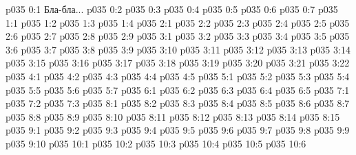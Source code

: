 \author{Глава архангелов}
\vs p035 0:1  Бла-бла...
\vs p035 0:2 
\vs p035 0:3 
\vs p035 0:4 
\vs p035 0:5 
\vs p035 0:6 
\vs p035 0:7 \pc 
{}
\vs p035 1:1 
\vs p035 1:2 
\vs p035 1:3 
\vs p035 1:4 
\vs p035 2:1 
\vs p035 2:2 
\vs p035 2:3 \pc 
\vs p035 2:4 
\vs p035 2:5 
\vs p035 2:6 
\vs p035 2:7 
\vs p035 2:8 \pc 
\vs p035 2:9 
\vs p035 3:1 
\vs p035 3:2 
\vs p035 3:3 
\vs p035 3:4 
\vs p035 3:5 
\vs p035 3:6 
\vs p035 3:7 
\vs p035 3:8 
\vs p035 3:9 
\vs p035 3:10 \pc 
\vs p035 3:11 \pc 
\vs p035 3:12 
\vs p035 3:13 \pc 
\vs p035 3:14 
\vs p035 3:15 
\vs p035 3:16 
\vs p035 3:17 
\vs p035 3:18 
\vs p035 3:19 
\vs p035 3:20 \pc 
\vs p035 3:21 
\vs p035 3:22 
\vs p035 4:1 
\vs p035 4:2 \pc 
\vs p035 4:3 
\vs p035 4:4 
\vs p035 4:5 \pc 
{}
\vs p035 5:1 
\vs p035 5:2 \pc 
\vs p035 5:3 \pc 
\vs p035 5:4 
\vs p035 5:5 
\vs p035 5:6 
\vs p035 5:7 
\vs p035 6:1 
\vs p035 6:2 
\vs p035 6:3 
\vs p035 6:4 
\vs p035 6:5 
\vs p035 7:1 
\vs p035 7:2 
\vs p035 7:3 
\vs p035 8:1 
\vs p035 8:2 
\vs p035 8:3 
\vs p035 8:4 
\vs p035 8:5 
\vs p035 8:6 
\vs p035 8:7 \pc 
\vs p035 8:8 
\vs p035 8:9 \pc 
\vs p035 8:10 
\vs p035 8:11 
\vs p035 8:12 
\vs p035 8:13 
\vs p035 8:14 
\vs p035 8:15 \pc 
{}
\vs p035 9:1 
\vs p035 9:2 
\vs p035 9:3 
\vs p035 9:4 
\vs p035 9:5 \pc 
\vs p035 9:6 
\vs p035 9:7 
\vs p035 9:8 
\vs p035 9:9 \pc 
\vs p035 9:10 
\vs p035 10:1 
\vs p035 10:2 
\vs p035 10:3 
\vs p035 10:4 \pc 
\vs p035 10:5 \pc 
\vsetoff
\vs p035 10:6 
\quizlink
